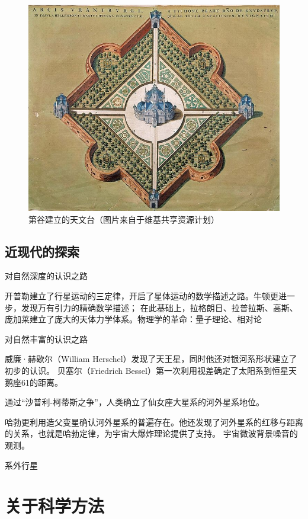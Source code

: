 \documentclass[a4paper,10.5pt]{book}
\begin{document}
\begin{figure}[ht]
\centering
\includegraphics[width=5.0in]{images/1_09-Uraniborgskiss.jpg}
\caption{第谷建立的天文台（图片来自于维基共享资源计划）}
\end{figure}

\subsection{近现代的探索}

对自然深度的认识之路

开普勒建立了行星运动的三定律，开启了星体运动的数学描述之路。牛顿更进一步，发现万有引力的精确数学描述；
在此基础上，拉格朗日、拉普拉斯、高斯、庞加莱建立了庞大的天体力学体系。物理学的革命：量子理论、相对论

对自然丰富的认识之路

威廉·赫歇尔（William Herschel）发现了天王星，同时他还对银河系形状建立了初步的认识。
贝塞尔（Friedrich Bessel）第一次利用视差确定了太阳系到恒星天鹅座61的距离。

通过“沙普利-柯蒂斯之争”，人类确立了仙女座大星系的河外星系地位。

哈勃更利用造父变星确认河外星系的普遍存在。他还发现了河外星系的红移与距离的关系，也就是哈勃定律，为宇宙大爆炸理论提供了支持。
宇宙微波背景噪音的观测。

系外行星

\section{关于科学方法}
\end{document}
